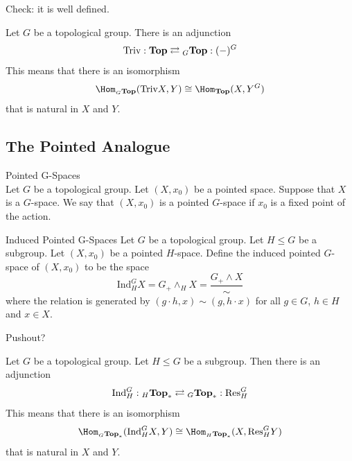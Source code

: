 \documentclass[a4paper]{article}
\begin{document}
Check: it is well defined.

\begin{prp}{}{} Let $G$ be a topological group. There is an adjunction $$\text{Triv}:\bold{Top}\rightleftarrows{_G\bold{Top}}:(-)^G$$ This means that there is an isomorphism $$\Hom_{_G\bold{Top}}(\text{Triv}X,Y)\cong\Hom_\bold{Top}(X,Y^G)$$ that is natural in $X$ and $Y$. 
\end{prp}

\subsection{The Pointed Analogue}
\begin{defn}{Pointed G-Spaces}{}\\
Let $G$ be a topological group. Let $(X,x_0)$ be a pointed space. Suppose that $X$ is a $G$-space. We say that $(X,x_0)$ is a pointed $G$-space if $x_0$ is a fixed point of the action. 
\end{defn}

\begin{defn}{Induced Pointed G-Spaces}{} Let $G$ be a topological group. Let $H\leq G$ be a subgroup. Let $(X,x_0)$ be a pointed $H$-space. Define the induced pointed $G$-space of $(X,x_0)$ to be the space $$\text{Ind}_H^GX=G_+\wedge_HX=\frac{G_+\wedge X}{\sim}$$ where the relation is generated by $(g\cdot h,x)\sim(g,h\cdot x)$ for all $g\in G$, $h\in H$ and $x\in X$. 
\end{defn}

Pushout?

\begin{prp}{}{} Let $G$ be a topological group. Let $H\leq G$ be a subgroup. Then there is an adjunction $$\text{Ind}_H^G:{_H\bold{Top}_\ast}\rightleftarrows{_G\bold{Top}_\ast}:\text{Res}_H^G$$ This means that there is an isomorphism $$\Hom_{_G\bold{Top}_\ast}(\text{Ind}_H^GX,Y)\cong\Hom_{_H\bold{Top}_\ast}(X,\text{Res}_H^GY)$$ that is natural in $X$ and $Y$. 
\end{prp}
\end{document}
